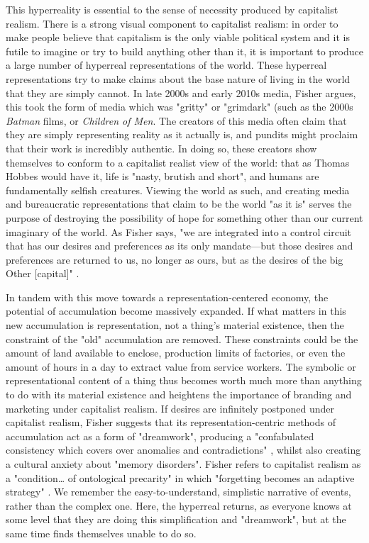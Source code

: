 This hyperreality is essential to the sense of necessity produced by capitalist realism. There is a strong visual component to capitalist realism: in order to make people believe that capitalism is the only viable political system and it is futile to imagine or try to build anything other than it, it is important to produce a large number of hyperreal representations of the world. These hyperreal representations try to make claims about the base nature of living in the world that they are simply cannot. In late 2000s and early 2010s media, Fisher argues, this took the form of media which was "gritty" or "grimdark" (such as the 2000s \textit{Batman} films, or \emph{Children of Men}. The creators of this media often claim that they are simply representing reality as it actually is, and pundits might proclaim that their work is incredibly authentic. In doing so, these creators show themselves to conform to a capitalist realist view of the world: that as Thomas Hobbes would have it, life is "nasty, brutish and short", and humans are fundamentally selfish creatures. Viewing the world as such, and creating media and bureaucratic representations that claim to be the world "as it is" serves the purpose of destroying the possibility of hope for something other than our current imaginary of the world. As Fisher says, "we are integrated into a control circuit that has our desires and preferences as its only mandate—but those desires and preferences are returned to us, no longer as ours, but as the desires of the big Other [capital]" \citeyearpar[p. 53]{fisher_capitalist_2009}.

In tandem with this move towards a representation-centered economy, the potential  of accumulation become massively expanded. If what matters in this new accumulation is representation, not a thing's material existence, then the constraint of the "old" accumulation are removed. These constraints could be the amount of land available to enclose, production limits of factories, or even the amount of hours in a day to extract value from service workers. The symbolic or representational content of a thing thus becomes worth much more than anything to do with its material existence and heightens the importance of branding and marketing under capitalist realism. If desires are infinitely postponed under capitalist realism, Fisher suggests that its representation-centric methods of accumulation act as a form of "dreamwork", producing a "confabulated consistency which covers over anomalies and contradictions" \citep[p. 64]{fisher_capitalist_2009}, whilst also creating a cultural anxiety about "memory disorders". Fisher refers to capitalist realism as a "condition\ldots{} of ontological precarity" in which "forgetting becomes an adaptive strategy" \citep[p. 60]{fisher_capitalist_2009}. We remember the easy-to-understand, simplistic narrative of events, rather than the complex one.  Here, the hyperreal returns, as everyone knows at some level that they are doing this simplification and "dreamwork", but at the same time finds themselves unable to do so.

